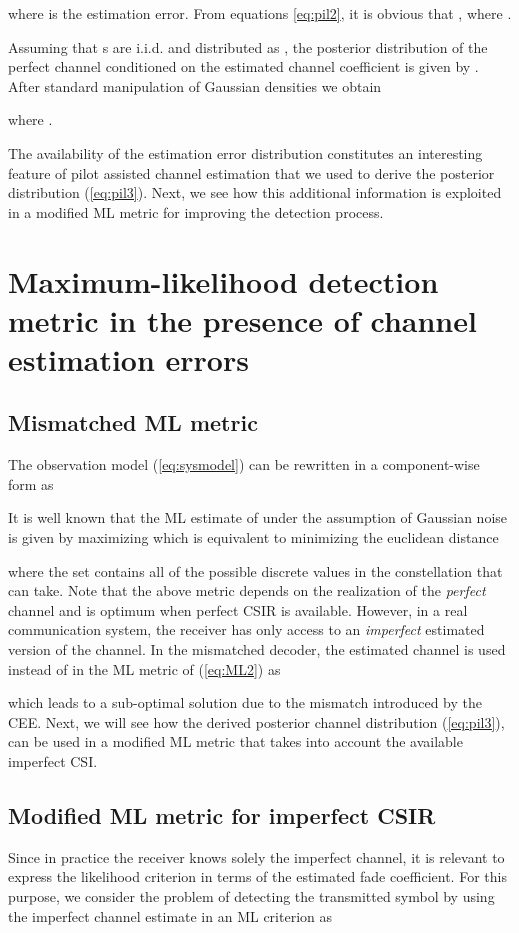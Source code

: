 \documentclass{article}
\begin{document}
where  is the estimation error. 
From equations \eqref{eq:pil2}, it is obvious that , where .

Assuming that s are i.i.d. and distributed as , the posterior distribution of the perfect channel conditioned on the estimated channel coefficient is given by .  
After standard manipulation of Gaussian densities we obtain 

where .

The availability of the estimation error distribution constitutes an interesting feature of pilot assisted channel estimation that we used to derive the posterior distribution (\ref{eq:pil3}). Next, we see how this additional information is exploited in a modified ML metric for improving the detection process.  
\section{Maximum-likelihood detection metric in the presence of channel estimation errors}
\label{sec:MLmetric}
\subsection{Mismatched ML metric}
The observation model (\ref{eq:sysmodel}) can be rewritten in a component-wise form as

It is well known that the ML estimate of  under the assumption of Gaussian noise is given by maximizing  which is equivalent to minimizing the euclidean distance
 
where the set  contains all of the possible discrete values in the constellation that  can take.   
Note that the above metric depends on the realization of the {\it perfect} channel  and is optimum when perfect CSIR is available. However, in a real communication system, the receiver has only access to an {\it imperfect} estimated version of the channel. In the mismatched decoder, the estimated channel  is used instead of  in the ML metric of (\ref{eq:ML2}) as 
 
which leads to a sub-optimal solution due to the mismatch introduced by the CEE. Next, we will see how the derived posterior channel distribution (\ref{eq:pil3}), can be used in a modified ML metric that takes into account the available imperfect CSI.    
\subsection{Modified ML metric for imperfect CSIR}    
Since in practice the receiver knows solely the imperfect channel, it is relevant to express the likelihood criterion in terms of the estimated fade coefficient. For this purpose, we consider the problem of detecting the transmitted symbol  by using the imperfect channel estimate  in an ML criterion as
 
\end{document}
